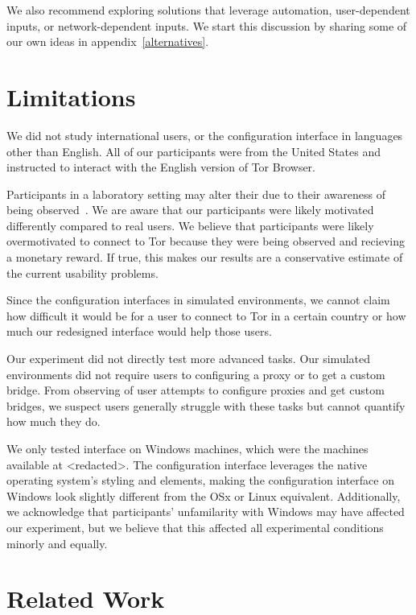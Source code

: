 \documentclass[USenglish,oneside,twocolumn]{article}
\begin{document}
We also recommend exploring solutions that leverage automation, user-dependent inputs, or network-dependent inputs. We start this discussion by sharing some of our own ideas in appendix~\ref{alternatives}. 

\section{Limitations}
\label{sec:limitations}
We did not study international users, or the configuration interface in languages other than English. All of our participants were from the United States and instructed to interact with the English version of Tor Browser.

Participants in a laboratory setting may alter their due to their awareness of being observed~\cite{mccarney2007hawthorne}. We are aware that our participants were likely motivated differently compared to real users. We believe that participants were likely overmotivated to connect to Tor because they were being observed and recieving a monetary reward. If true, this makes our results are a conservative estimate of the current usability problems. 

Since the configuration interfaces in simulated environments, we cannot claim how difficult it would be for a user to connect to Tor in a certain country or how much our redesigned interface would help those users.  

Our experiment did not directly test more advanced tasks. Our simulated environments did not require users to configuring a proxy or to get a custom bridge. From observing of user attempts to configure proxies and get custom bridges, we suspect users generally struggle with these tasks but cannot quantify how much they do. 

We only tested interface on Windows machines, which were the machines available at <redacted>. %
The configuration interface leverages the native operating system's styling and elements, making the configuration interface on Windows look slightly different from the OSx or Linux equivalent. Additionally, we acknowledge that participants' unfamilarity with Windows may have affected our experiment, but we believe that this affected all experimental conditions minorly and equally.  

\section{Related Work}
\label{sec:related} 
\end{document}
